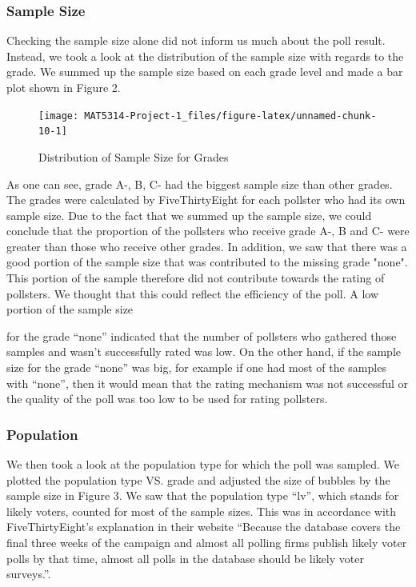 \documentclass[
  11pt,
]{article}
\begin{document}
\hypertarget{sample-size}{%
\subsubsection{Sample Size}\label{sample-size}}

Checking the sample size alone did not inform us much about the poll
result. Instead, we took a look at the distribution of the sample size
with regards to the grade. We summed up the sample size based on each
grade level and made a bar plot shown in Figure 2.

\begin{minipage}[t]{0.55\textwidth}
\begin{figure}
\texttt{[image: MAT5314-Project-1\_files/figure-latex/unnamed-chunk-10-1]} \caption{Distribution of Sample Size for Grades}\label{fig:unnamed-chunk-10}
\end{figure}
\end{minipage}
\begin{minipage}[t]{0.45\textwidth}
\vspace{0pt}
As one can see, grade A-, B, C- had the biggest sample size than other grades. The grades were calculated by FiveThirtyEight for each pollster who had its own sample size. Due to the fact that we summed up the sample size, we could conclude that the proportion of the pollsters who receive grade A-, B and C- were greater than those who receive other grades. In addition, we saw that there was a good portion of the sample size that was contributed to the missing grade "none". This portion of the sample therefore did not contribute towards the rating of pollsters. We thought that this could reflect the efficiency of the poll. A low portion of the sample size 
\end{minipage}

for the grade ``none'' indicated that the number of pollsters who
gathered those samples and wasn't successfully rated was low. On the
other hand, if the sample size for the grade ``none'' was big, for
example if one had most of the samples with ``none'', then it would mean
that the rating mechanism was not successful or the quality of the poll
was too low to be used for rating pollsters.

\hypertarget{population}{%
\subsubsection{Population}\label{population}}

We then took a look at the population type for which the poll was
sampled. We plotted the population type VS. grade and adjusted the size
of bubbles by the sample size in Figure 3. We saw that the population
type ``lv'', which stands for likely voters, counted for most of the
sample sizes. This was in accordance with FiveThirtyEight's explanation
in their website ``Because the database covers the final three weeks of
the campaign and almost all polling firms publish likely voter polls by
that time, almost all polls in the database should be likely voter
surveys.''.
\end{document}
